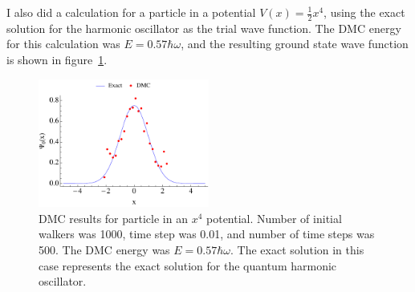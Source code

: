 I also did a calculation for a particle in a potential $V(x)=\frac{1}{2}x^4$, using the exact solution for the harmonic oscillator as the trial wave function. The DMC energy for this calculation was $E=0.57\hbar\omega$, and the resulting ground state wave function is shown in figure~\ref{fig:1dho4}.
\begin{figure}[h!]
  \centering
    \includegraphics[width=0.5\textwidth]{notexact4}
    \caption{DMC results for particle in an $x^4$ potential. Number of initial walkers was 1000, time step was 0.01, and number of time steps was 500. The DMC energy was $E=0.57\hbar\omega$. The exact solution in this case represents the exact solution for the quantum harmonic oscillator.}
    \label{fig:1dho4}
\end{figure}

